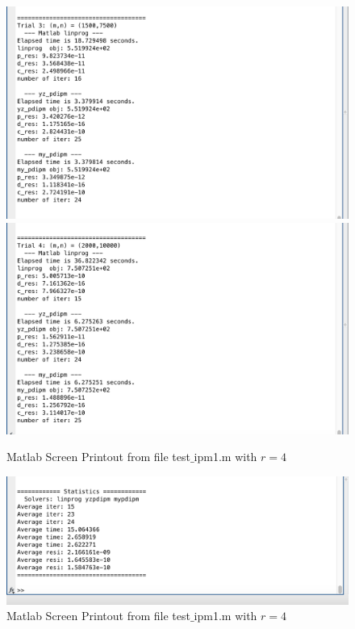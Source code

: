 \begin{figure}[H]
\centering
\includegraphics[width=15cm]{f_15}
\includegraphics[width=15cm]{f_16}
\caption{Matlab Screen Printout from file test$\_$ipm1.m with $r=4$}
\end{figure}
\begin{figure}[H]
\centering
\includegraphics[width=15cm]{f_17}
\caption{Matlab Screen Printout from file test$\_$ipm1.m with $r=4$}
\end{figure}
